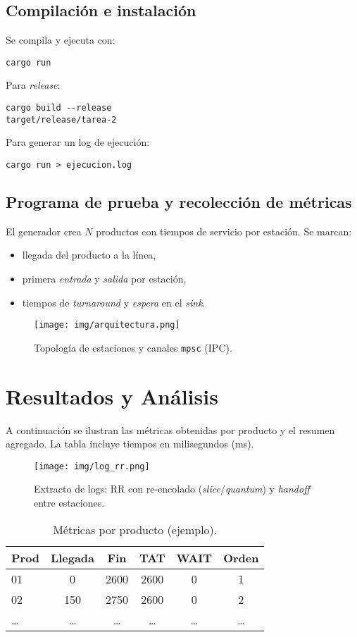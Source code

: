 \documentclass[conference]{IEEEtran}
\begin{document}
\subsection{Compilación e instalación}
Se compila y ejecuta con:
\begin{verbatim}
cargo run
\end{verbatim}
Para \textit{release}:
\begin{verbatim}
cargo build --release
target/release/tarea-2
\end{verbatim}
Para generar un log de ejecución:
\begin{verbatim}
cargo run > ejecucion.log
\end{verbatim}

\subsection{Programa de prueba y recolección de métricas}
El generador crea $N$ productos con tiempos de servicio por estación. Se marcan:
\begin{itemize}
  \item llegada del producto a la línea,
  \item primera \textit{entrada} y \textit{salida} por estación,
  \item tiempos de \textit{turnaround} y \textit{espera} en el \textit{sink}.
\end{itemize}

\begin{figure}[H]
    \centering
    \texttt{[image: img/arquitectura.png]}
    \caption{Topología de estaciones y canales \texttt{mpsc} (IPC).}
\end{figure}

\section{Resultados y Análisis}
A continuación se ilustran las métricas obtenidas por producto y el resumen agregado. La tabla incluye tiempos en milisegundos (ms).

\begin{figure}[H]
    \centering
    \texttt{[image: img/log\_rr.png]}
    \caption{Extracto de logs: RR con re-encolado (\textit{slice}/\textit{quantum}) y \textit{handoff} entre estaciones.}
\end{figure}

\begin{table}[H]
\centering
\caption{Métricas por producto (ejemplo).}
\begin{tabular}{lccccc}
\hline
Prod & Llegada & Fin & TAT & WAIT & Orden \\
\hline
01 & 0   & 2600 & 2600 & 0   & 1 \\
02 & 150 & 2750 & 2600 & 0   & 2 \\
\ldots & \ldots & \ldots & \ldots & \ldots & \ldots \\
\hline
\end{tabular}
\end{table}
\end{document}
